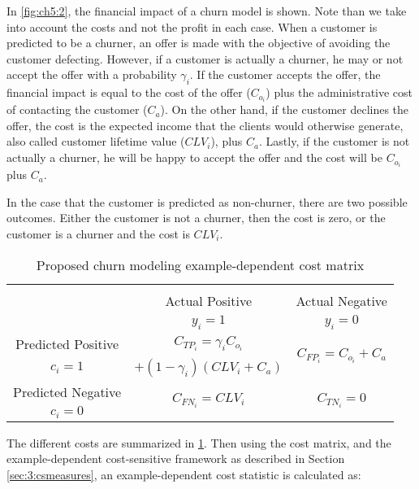 In \figurename{ \ref{fig:ch5:2}}, the financial impact of a churn model is shown. Note than we take 
into account the costs and not the profit in each case.
When a customer is predicted to be a churner, an offer is made with the objective of avoiding 
the customer defecting. However, if a customer is actually a churner, he may or not accept the 
offer with a probability $\gamma_i$. If the customer accepts the offer, the financial impact is 
equal to the cost of the offer ($C_{o_i}$) plus the administrative cost of contacting the 
customer ($C_a$). On the other hand, if the customer declines the offer, the cost is the 
expected 	income that the clients would otherwise generate, also called customer lifetime value 
($CLV_i$), 	plus $C_a$. Lastly, if the customer is not actually a churner, he will be happy to 
accept the 	offer and the cost will be $C_{o_i}$ plus $C_a$.
	
In the case that the customer is predicted as non-churner, there are two possible outcomes. 
Either the customer is not a churner, then the cost is zero, or the customer is a churner and the 
cost is $CLV_i$. 


  \begin{table}[b]
	  \centering
	  \footnotesize
     \begin{tabular}{c|c|c}
        \multicolumn{3}{c}{}\\
			\multicolumn{1}{c|}{}  & Actual Positive& Actual Negative \\
			\multicolumn{1}{c|}{} & $y_i=1$& $y_i=0$ \\
			\hline
			Predicted Positive 		& $C_{TP_i}=\gamma_iC_{o_i}$ & 
\multirow{2}{*}{$C_{FP_i}=C_{o_i}+C_a$}\\
			$c_i=1$ & $+(1-\gamma_i)(CLV_i+C_a)$ &\\
			\hline
			Predicted Negative  	& \multirow{ 2}{*}{$C_{FN_i}=CLV_i$} & \multirow{ 
			2}{*}{$C_{TN_i}=0$} \\
			$c_i=0$ & &\\
		\end{tabular}
		\caption{Proposed churn modeling example-dependent cost matrix}
    \label{tab:ch5:1}
  \end{table}

The different costs are summarized in \tablename{ \ref{tab:ch5:1}}.	Then using the cost 
matrix, and the example-dependent cost-sensitive framework as described in Section 
\ref{sec:3:csmeasures}, an example-dependent cost statistic is calculated as:


